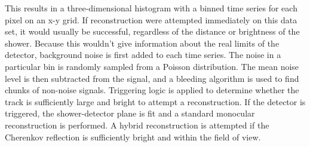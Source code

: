This results in a three-dimensional histogram with a binned time series for each pixel on an x-y grid. If reconstruction were attempted immediately on this data set, it would usually be successful, regardless of the distance or brightness of the shower. Because this wouldn't give information about the real limits of the detector, background noise is first added to each time series. The noise in a particular bin is randomly sampled from a Poisson distribution. The mean noise level is then subtracted from the signal, and a bleeding algorithm is used to find chunks of non-noise signals. Triggering logic is applied to determine whether the track is sufficiently large and bright to attempt a reconstruction. If the detector is triggered, the shower-detector plane is fit and a standard monocular reconstruction is performed. A hybrid reconstruction is attempted if the Cherenkov reflection is sufficiently bright and within the field of view.